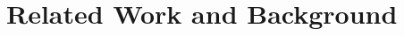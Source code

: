 \documentclass[10pt,twocolumn,letterpaper]{article}
\newcommand{\method}{R\textsc{e}V\textsc{ea}L\xspace}
\begin{document}
\begin{comment}
Experiments Part



This key contributions are as follows:
\begin{compactitem}
\item 
We propose \method to conduct end-to-end retrieval augmented visual language model training. 
\item We propose a unified online memory representation encoding a wide range of knowledge sources, and show that for different queries the model could learn to retrieve different kinds of knowledges though retrieval learning.
\item We pre-train \method on large-scale image caption datasets, and the learned model achieve SOTA performance on several knowledge-intensive tasks, including OK-VQA, A-OKVQA, etc.
\end{compactitem}








\end{comment} \section{Related Work and Background}\label{sec:related}
\end{document}
